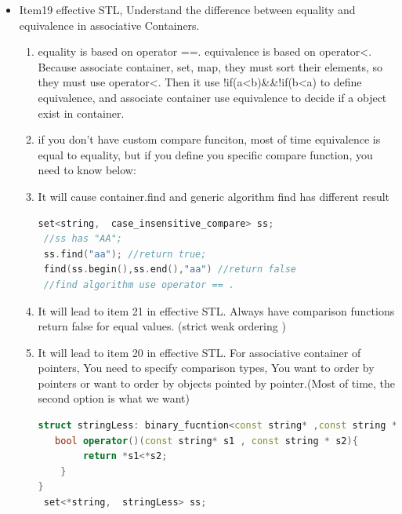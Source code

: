 \documentclass[a4paper,11pt,twoside]{book}
\begin{document}
\begin{itemize}
\item Item19 effective STL, Understand the difference between equality and equivalence in associative Containers.
  \begin{enumerate}
  \item equality is based on operator ==. equivalence is based on operator<. Because associate container, set, map, they must sort their elements, so they must use operator<. Then it use !if(a<b)\&\&!if(b<a) to define equivalence, and associate container use equivalence to decide if a object exist in container.
  \item if you don't have custom compare funciton, most of time equivalence is equal to equality, but if you define you specific compare function, you need to know below:
  \item It will cause container.find and generic algorithm find has different result
\begin{lstlisting}[frame=single, language=c++]
 set<string,  case_insensitive_compare> ss;
 //ss has "AA";
 ss.find("aa"); //return true;
 find(ss.begin(),ss.end(),"aa") //return false
 //find algorithm use operator == .
\end{lstlisting}
  \item It will lead to item 21 in effective STL. Always have comparison functions return false for equal values. (strict weak ordering )
  \item It will lead to item 20 in effective STL. For associative container of pointers, You need to specify comparison types, You want to order by pointers or want to order by objects pointed by pointer.(Most of time, the second option is what we want)
\begin{lstlisting}[frame=single, language=c++]
struct stringLess: binary_fucntion<const string* ,const string * , bool>{
   bool operator()(const string* s1 , const string * s2){
        return *s1<*s2;
	}
}
 set<*string,  stringLess> ss;
\end{lstlisting}


  \end{enumerate}

\end{itemize}
\end{document}
